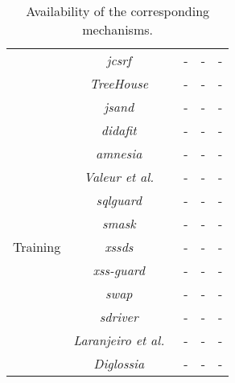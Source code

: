 \documentclass[conference]{IEEEtran}
\begin{document}
\begin{table*}
\begin{threeparttable}
\begin{small}
{\begin{tabular}{l|c|ccc}
	&   {\it j{\sc csrf}}~\cite{PS11} & - & - & - \\
    &   {\it TreeHouse}~\cite{IW12} & - & - & - \\
   	&   {\it {\sc js}and}~\cite{AVBPDP12} & - & - & - \\
	\hline
	\hline  
        \multirow{12}{*}{Training}
    &   {\it {\sc didafit}}~\cite{LLW02} & - & - & - \\
	&   {\it {\sc amnesia}}~\cite{HO05,HO06,HO05b} & - & - & - \\ 
	&   {\it Valeur et al.}~\cite{VMV05} & - & - & - \\
	& 	{\it {\sc sqlg}uard}~\cite{BWS05} & - & - & - \\
	& 	{\it {\sc sm}ask}~\cite{JB07} & - & - & - \\
	& 	{\it {\sc xssds}}~\cite{JEP08} & - & - & - \\
    & 	{\it {\sc xss-guard}}~\cite{BV08} & - & - & - \\
    & 	{\it {\sc swap}}~\cite{WPLKK09} & - & - & - \\
	& 	{\it {\sc sd}river}~\cite{MS09,MKS09,MKLS11} & - & - & - \\
	& 	{\it Laranjeiro et al.}~\cite{LVM09,ALVM09,LVM10} & - & - & - \\
	& 	{\it Diglossia}~\cite{SMS13} & - & - & - \\
	\hline
    \end{tabular}}
    \caption{Availability of the corresponding mechanisms.}
    \label{tab:comp2}
    \end{small}
    \end{threeparttable}
\end{table*}



\end{document}
